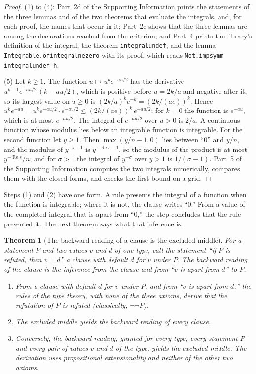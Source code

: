 \documentclass[11pt]{article}
\newtheorem{theorem}{Theorem}[section]
\theoremstyle{definition}
\theoremstyle{remark}
\newcommand{\re}{\operatorname{Re}}
\DeclareRobustCommand{\lean}[1]{{\renewcommand{\_}{\textunderscore\allowbreak}\texttt{#1}}}
\begin{document}
\begin{proof}
(1) to (4): Part~2d of the Supporting Information prints the statements of the three lemmas and of the two theorems that evaluate the integrals, and, for each proof, the names that occur in it; Part~2c shows that the three lemmas are among the declarations reached from the criterion; and Part~4 prints the library's definition of the integral, the theorem \lean{integral\_undef}, and the lemma \lean{Integrable.of\_integral\_ne\_zero} with its proof, which reads \lean{Not.imp\_symm integral\_undef h}.

(5) Let $k\ge1$. The function $u\mapsto u^{k}e^{-au/2}$ has the derivative $u^{k-1}e^{-au/2}\,(k-au/2)$, which is positive before $u=2k/a$ and negative after it, so its largest value on $u\ge0$ is $(2k/a)^{k}e^{-k}=(2k/(ae))^{k}$. Hence $u^{k}e^{-au}=u^{k}e^{-au/2}\cdot e^{-au/2}\le(2k/(ae))^{k}\,e^{-au/2}$; for $k=0$ the function is $e^{-au}$, which is at most $e^{-au/2}$. The integral of $e^{-au/2}$ over $u>0$ is $2/a$. A continuous function whose modulus lies below an integrable function is integrable. For the second function let $y\ge1$. Then $\max(y/n-1,0)$ lies between ``0'' and $y/n$, and the modulus of $y^{-s-1}$ is $y^{-\re s-1}$, so the modulus of the product is at most $y^{-\re s}/n$; and for $\sigma>1$ the integral of $y^{-\sigma}$ over $y>1$ is $1/(\sigma-1)$. Part~5 of the Supporting Information computes the two integrals numerically, compares them with the closed forms, and checks the first bound on a grid.
\end{proof}

\noindent Steps (1) and (2) have one form. A rule presents the integral of a function when the function is integrable; where it is not, the clause writes ``0.'' From a value of the completed integral that is apart from ``0,'' the step concludes that the rule presented it. The next theorem says what that inference is.

\begin{theorem}[The backward reading of a clause is the excluded middle]\label{thm:backward}
For a statement $P$ and two values $v$ and $d$ of one type, call the statement ``if $P$ is refuted, then $v=d$'' a \emph{clause with default $d$ for $v$ under $P$}. The \emph{backward reading} of the clause is the inference from the clause and from ``$v$ is apart from $d$'' to $P$.
\begin{enumerate}[leftmargin=2em,itemsep=1pt]
\item From a clause with default $d$ for $v$ under $P$, and from ``$v$ is apart from $d$,'' the rules of the type theory, with none of the three axioms, derive that the refutation of $P$ is refuted (classically, $\neg\neg P$).
\item The excluded middle yields the backward reading of every clause.
\item Conversely, the backward reading, granted for every type, every statement $P$ and every pair of values $v$ and $d$ of the type, yields the excluded middle. The derivation uses propositional extensionality and neither of the other two axioms.
\end{enumerate}
\end{theorem}
\end{document}
